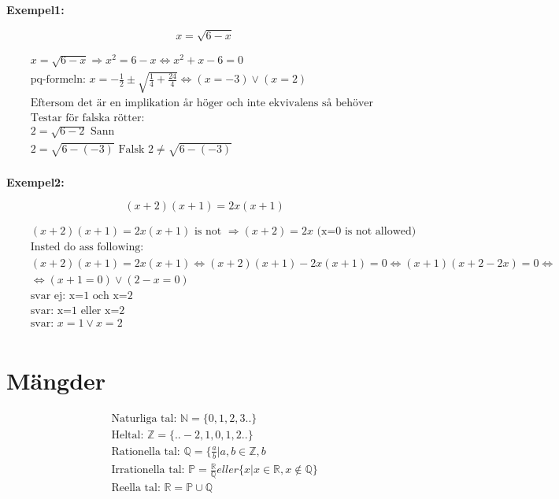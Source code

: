 \textbf{Exempel1:}\par
\begin{equation}
  x = \sqrt{6 - x}
\end{equation}

\begin{align*}
  &\quad  x = \sqrt{6 - x} \Rightarrow x^2 = 6 - x \Leftrightarrow x^2 + x - 6 = 0 \\
  &\quad  \text{pq-formeln: } x = -\frac{1}{2} \pm \sqrt{\frac{1}{4} + \frac{24}{4}} \Leftrightarrow (x=-3) \lor (x=2) \\
  &\quad \text{Eftersom det är en implikation år höger och inte ekvivalens så behöver inte rötterna vara sanna }
  &\quad \\
  &\quad \text{Testar för falska rötter: } \\
  &\quad 2 = \sqrt{6-2} \text{ Sann} \\
  &\quad 2 = \sqrt{6-(-3)} \text{ Falsk } 2 \ne \sqrt{6-(-3)} \\
\end{align*}


\textbf{Exempel2:}\par
\begin{equation}
  (x+2)(x+1) = 2x(x+1)
\end{equation}

\begin{align*}
  &\quad (x+2)(x+1) = 2x(x+1) \text{ is not } \Rightarrow (x+2) = 2x \text{ (x=0 is not allowed)} \\
  &\quad \text{Insted do ass following: } \\
  &\quad (x+2)(x+1) = 2x(x+1) \Leftrightarrow (x+2)(x+1) - 2x(x+1) = 0 \Leftrightarrow (x+1)(x+2-2x) = 0 \Leftrightarrow \\
  &\quad \Leftrightarrow (x+1=0)\lor(2-x=0) \\
  &\quad \text{svar ej: x=1 och x=2} \\
  &\quad \text{svar: x=1 eller x=2} \\
  &\quad \text{svar: } x=1 \lor x=2 \\
\end{align*}


\newpage

\section{Mängder}
\begin{align*}
  &\quad \text{Naturliga tal: } \mathbb{N} = \{0, 1, 2 , 3 ..  \} \\
  &\quad \text{Heltal: }\mathbb{Z} = \{.. -2, 1, 0, 1, 2 ..  \} \\
  &\quad \text{Rationella tal: }\mathbb{Q} = \{ \frac{a}{b} | a,b \in \mathbb{Z}, b \\
  &\quad \text{Irrationella tal: }\mathbb{P} = \frac{\mathbb{R}}{\mathbb{Q}}eller \{ x | x \in \mathbb{R}, x \notin \mathbb{Q} \} \\
  &\quad \text{Reella tal: }\mathbb{R} =  \mathbb{P} \cup \mathbb{Q} \\
\end{align*}


